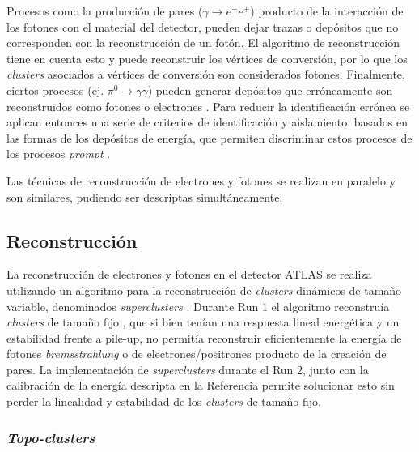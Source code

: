 Procesos como la producción de pares ($\gamma\to e^{-}e^{+}$) producto de la interacción de los fotones con el material del detector, pueden dejar trazas o depósitos que no corresponden con la reconstrucción de un fotón. El algoritmo de reconstrucción tiene en cuenta esto y puede reconstruir los vértices de conversión, por lo que los \textit{clusters} asociados a vértices de conversión son considerados fotones. Finalmente, ciertos procesos (ej. $\pi^{0}\to\gamma\gamma$) pueden generar depósitos que erróneamente son reconstruidos como fotones o electrones . Para reducir la identificación errónea se aplican entonces una serie de criterios de identificación y aislamiento, basados en las formas de los depósitos de energía, que permiten discriminar estos procesos de los procesos \textit{prompt} . 

Las técnicas de reconstrucción de electrones y fotones se realizan en paralelo y son similares, pudiendo ser
descriptas simultáneamente.

\subsection{Reconstrucción}


La reconstrucción de electrones y fotones en el detector ATLAS se realiza utilizando un algoritmo para la reconstrucción de \textit{clusters} dinámicos de tamaño variable, denominados \textit{superclusters} \cite{EGAM-2018-01}. Durante Run 1 el algoritmo reconstruía \textit{clusters} de tamaño fijo \cite{PERF-2013-04, PERF-2013-05, Lampl:1099735}, que si bien tenían una respuesta lineal energética y un estabilidad frente a pile-up, no permitía reconstruir eficientemente la energía de fotones \textit{bremsstrahlung} o de electrones/positrones producto de la creación de pares. La implementación de \textit{superclusters} durante el Run 2, junto con la calibración de la energía descripta en la Referencia \cite{PERF-2017-03} permite solucionar esto sin perder la linealidad y estabilidad de los \textit{clusters} de tamaño fijo.

\subsubsection{\textit{Topo-clusters}}

